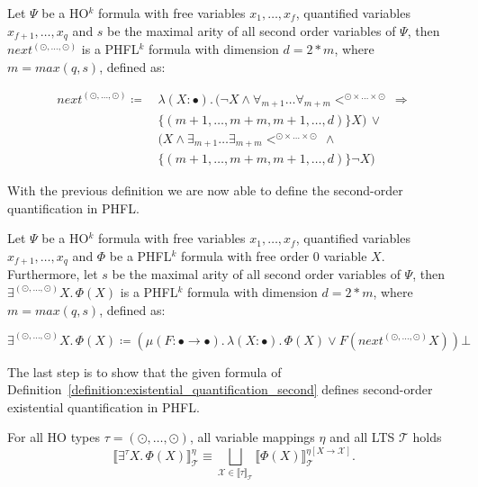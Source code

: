 \begin{definition}
    \label{definition:lower_bounds_next_second}
    Let $\Psi$ be a HO$^k$ formula with free variables $x_1, \dots, x_f$, quantified variables $x_{f+1}, \dots,
    x_q$ and $s$ be the maximal arity of all second order variables of $\Psi$, then $next^{(\odot, \dots, \odot)}$
    is a PHFL$^k$ formula with dimension $d = 2 * m$, where $m = max({q, s})$, defined as:

    \begin{align*}
        next^{(\odot, \dots, \odot)} \coloneqq &\,\lambda (X \colon \bullet).\, (\neg X \wedge \forall_{m +
        1}\dots\forall_{m + m}<^{\odot \times \dots \times \odot}\, \Rightarrow \\&\,\{(m +
        1, \dots, m + m, m + 1, \dots, d)\} X) \,\vee \\&\,(X \wedge \exists_{m + 1}\dots\exists_{m + m} <^{\odot
        \times \dots \times \odot} \,\wedge \\&\,\{(m + 1, \dots, m + m, m + 1, \dots, d)\}
        \neg X)
    \end{align*}
\end{definition}

With the previous definition we are now able to define the second-order quantification in PHFL.

\begin{definition}
    \label{definition:existential_quantification_second}
    Let $\Psi$ be a HO$^k$ formula with free variables $x_1, \dots, x_f$, quantified variables $x_{f+1}, \dots,
    x_q$ and $\Phi$ be a PHFL$^k$ formula with free order $0$ variable $X$. Furthermore, let $s$ be the maximal arity
    of all second order variables of $\Psi$, then $\exists^{(\odot, \dots, \odot)}X .\,\Phi(X)$
    is a PHFL$^k$ formula with dimension $d = 2 * m$, where $m = max({q, s})$, defined as:

    \[\exists^{(\odot, \dots, \odot)}X.\, \Phi(X) \coloneqq (\mu (F \colon \bullet \rightarrow \bullet).\, \lambda (X
    \colon \bullet).\, \Phi(X) \vee F(next^{(\odot, \dots, \odot)} X)) \bot
    \]
\end{definition}

The last step is to show that the given formula of Definition~\ref{definition:existential_quantification_second} defines
second-order existential quantification in PHFL.

\begin{lemma}
    \label{lemma:existential_quantifier_second}
    For all HO types $\tau = (\odot, \dots, \odot)$, all variable mappings $\eta$ and all LTS $\mathcal{T}$ holds
    \[\llbracket \exists^\tau X.\,\Phi(X)\rrbracket^\eta_\mathcal{T} \equiv \underset{\mathcal{X} \in \llbracket \tau
    \rrbracket_\mathcal{T}}{\bigsqcup} \llbracket \Phi(X) \rrbracket^{\eta[X\rightarrow \mathcal{X}]}_\mathcal{T}.\]
\end{lemma}

